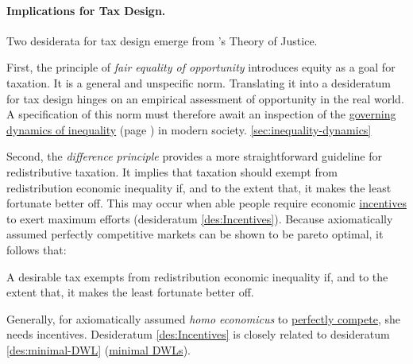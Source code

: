 \paragraph{Implications for Tax Design.}
Two desiderata for tax design emerge from \citeauthor{Rawls-1971}'s Theory of Justice.

First, the principle of \emph{fair equality of opportunity} introduces equity as a goal for taxation.
It is a general and unspecific norm.
Translating it into a desideratum for tax design hinges on an empirical assessment of  opportunity
 in the real world.
A specification of this norm must therefore await an inspection of the \hyperref[sec:inequality-dynamics]{governing dynamics of inequality} (page \pageref{sec:inequality-dynamics}) in modern society. \ref{sec:inequality-dynamics}

Second, the \emph{difference principle} provides a more straightforward guideline for redistributive taxation.
It implies that taxation should exempt from redistribution economic inequality if, and to the extent that, it makes the least fortunate better off.
This may occur when able people require economic \hyperref[des:Incentives]{incentives} to exert maximum efforts (desideratum \ref{des:Incentives}).
Because axiomatically assumed perfectly competitive markets can be shown to be pareto optimal, it follows that:

\begin{desideratum}
	\label{des:difference-principle}
	A desirable tax exempts from redistribution economic inequality if, and to the extent that, it makes the least fortunate better off.
\end{desideratum}

Generally, for axiomatically assumed \emph{homo economicus} to \hyperref[sec:perfect-competition]{perfectly compete}, she needs incentives.
Desideratum \ref{des:Incentives} is closely related to desideratum \ref{des:minimal-DWL} (\hyperref[des:minimal-DWL]{minimal DWLs}).



